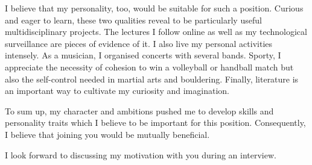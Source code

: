 \documentclass[11pt,a4paper,sans]{moderncv}        %
\begin{document}
\medskip

I believe that my personality, too, would be suitable for such a position.
Curious and eager to learn, these two qualities reveal to be particularly useful multidisciplinary projects. The lectures I follow online as well as my technological surveillance are pieces of evidence of it.
I also live my personal activities intensely. As a musician, I organised concerts with several bands. Sporty, I appreciate the necessity of cohesion to win a volleyball or handball match but also the self-control needed in martial arts and bouldering. Finally, literature is an important way to cultivate my curiosity and imagination.

To sum up, my character and ambitions pushed me to develop skills and personality traits which I believe to be important for this position. Consequently, I believe that joining you would be mutually beneficial.

\medskip

I look forward to discussing my motivation with you during an interview.

\makeletterclosing
\end{document}
